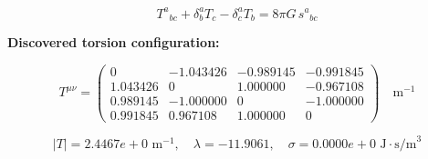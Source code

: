
\begin{equation}
  T^a{}_{bc} + \delta^a_b T_c - \delta^a_c T_b = 8\pi G \, s^a{}_{bc}
\end{equation}

\textbf{Discovered torsion configuration:}

\begin{equation}
  T^{\mu\nu} = \begin{pmatrix}
    0 & -1.043426 & -0.989145 & -0.991845 \\
    1.043426 & 0 & 1.000000 & -0.967108 \\
    0.989145 & -1.000000 & 0 & -1.000000 \\
    0.991845 & 0.967108 & 1.000000 & 0
  \end{pmatrix} \quad \text{m}^{-1}
\end{equation}

\begin{equation}
  |T| = 2.4467e+0 \text{ m}^{-1}, \quad
  \lambda = -11.9061, \quad
  \sigma = 0.0000e+0 \text{ J}\cdot\text{s/m}^3
\end{equation}